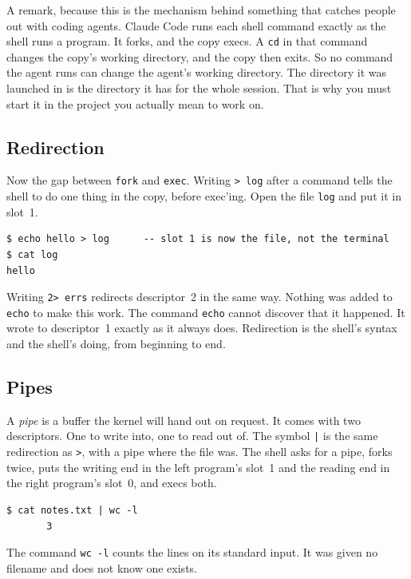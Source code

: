 \documentclass[11pt,a4paper]{article}
\begin{document}
A remark, because this is the mechanism behind something that catches people out with coding
agents. Claude Code runs each shell command exactly as the shell runs a program. It forks, and the
copy execs. A \texttt{cd} in that command changes the copy's working directory, and the copy then
exits. So no command the agent runs can change the agent's working directory. The directory it was
launched in is the directory it has for the whole session. That is why you must start it in the project you
actually mean to work on.

\subsection{Redirection}

Now the gap between \texttt{fork} and \texttt{exec}. Writing \texttt{> log} after a command tells
the shell to do one thing in the copy, before exec'ing. Open the file \texttt{log} and put it in
slot~1.

\begin{lstlisting}[language=SH]
$ echo hello > log      -- slot 1 is now the file, not the terminal
$ cat log
hello
\end{lstlisting}

Writing \texttt{2> errs} redirects descriptor~2 in the same way. Nothing was added to \texttt{echo} to
make this work. The command \texttt{echo} cannot discover that it happened. It wrote to descriptor~1 exactly as
it always does. Redirection is the shell's syntax and the shell's doing, from beginning to end.

\subsection{Pipes}

A \emph{pipe} is a buffer the kernel will hand out on request. It comes with two descriptors.
One to write into, one to read out of. The symbol \texttt{|} is the same redirection as \texttt{>}, with a pipe
where the file was. The shell asks for a pipe, forks twice, puts the writing end in the left
program's slot~1 and the reading end in the right program's slot~0, and execs both.

\begin{lstlisting}[language=SH]
$ cat notes.txt | wc -l
       3
\end{lstlisting}

The command \texttt{wc -l} counts the lines on its standard input. It was given no filename and does not
know one exists.
\end{document}
